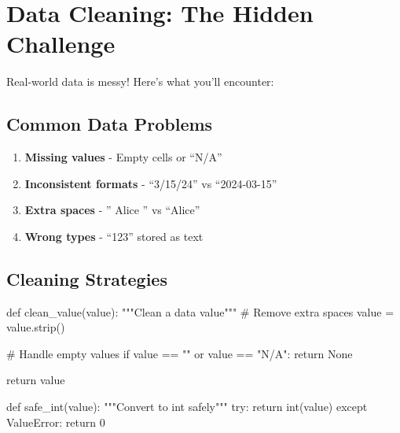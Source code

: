 \documentclass[
  letterpaper,
  DIV=11,
  numbers=noendperiod,
  oneside]{scrreprt}
\newenvironment{Shaded}{}{}
\newcommand{\BuiltInTok}[1]{\textcolor[rgb]{0.84,0.23,0.29}{#1}}
\newcommand{\CommentTok}[1]{\textcolor[rgb]{0.42,0.45,0.49}{#1}}
\newcommand{\ControlFlowTok}[1]{\textcolor[rgb]{0.84,0.23,0.29}{#1}}
\newcommand{\DecValTok}[1]{\textcolor[rgb]{0.00,0.36,0.77}{#1}}
\newcommand{\KeywordTok}[1]{\textcolor[rgb]{0.84,0.23,0.29}{#1}}
\newcommand{\NormalTok}[1]{\textcolor[rgb]{0.14,0.16,0.18}{#1}}
\newcommand{\OperatorTok}[1]{\textcolor[rgb]{0.14,0.16,0.18}{#1}}
\newcommand{\PreprocessorTok}[1]{\textcolor[rgb]{0.84,0.23,0.29}{#1}}
\newcommand{\StringTok}[1]{\textcolor[rgb]{0.01,0.18,0.38}{#1}}
\newcommand{\VariableTok}[1]{\textcolor[rgb]{0.89,0.38,0.04}{#1}}
\providecommand{\tightlist}{%
  \setlength{\itemsep}{0pt}\setlength{\parskip}{0pt}}\usepackage{longtable,booktabs,array}
\begin{document}
\section{Data Cleaning: The Hidden
Challenge}\label{data-cleaning-the-hidden-challenge}

Real-world data is messy! Here's what you'll encounter:

\subsection{Common Data Problems}\label{common-data-problems}

\begin{enumerate}
\def\labelenumi{\arabic{enumi}.}
\tightlist
\item
  \textbf{Missing values} - Empty cells or ``N/A''
\item
  \textbf{Inconsistent formats} - ``3/15/24'' vs ``2024-03-15''
\item
  \textbf{Extra spaces} - '' Alice '' vs ``Alice''
\item
  \textbf{Wrong types} - ``123'' stored as text
\end{enumerate}

\subsection{Cleaning Strategies}\label{cleaning-strategies}

\begin{Shaded}
\begin{Highlighting}[]
\KeywordTok{def}\NormalTok{ clean\_value(value):}
    \CommentTok{"""Clean a data value"""}
    \CommentTok{\# Remove extra spaces}
\NormalTok{    value }\OperatorTok{=}\NormalTok{ value.strip()}
    
    \CommentTok{\# Handle empty values}
    \ControlFlowTok{if}\NormalTok{ value }\OperatorTok{==} \StringTok{""} \KeywordTok{or}\NormalTok{ value }\OperatorTok{==} \StringTok{"N/A"}\NormalTok{:}
        \ControlFlowTok{return} \VariableTok{None}
    
    \ControlFlowTok{return}\NormalTok{ value}

\KeywordTok{def}\NormalTok{ safe\_int(value):}
    \CommentTok{"""Convert to int safely"""}
    \ControlFlowTok{try}\NormalTok{:}
        \ControlFlowTok{return} \BuiltInTok{int}\NormalTok{(value)}
    \ControlFlowTok{except} \PreprocessorTok{ValueError}\NormalTok{:}
        \ControlFlowTok{return} \DecValTok{0}
\end{Highlighting}
\end{Shaded}
\end{document}
